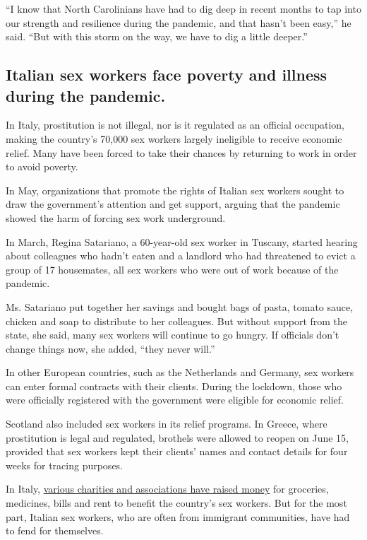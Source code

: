 ``I know that North Carolinians have had to dig deep in recent months to
tap into our strength and resilience during the pandemic, and that
hasn't been easy,'' he said. ``But with this storm on the way, we have
to dig a little deeper.''

\hypertarget{italian-sex-workers-face-poverty-and-illness-during-the-pandemic}{%
\subsection{Italian sex workers face poverty and illness during the
pandemic.}\label{italian-sex-workers-face-poverty-and-illness-during-the-pandemic}}

In Italy, prostitution is not illegal, nor is it regulated as an
official occupation, making the country's 70,000 sex workers largely
ineligible to receive economic relief. Many have been forced to take
their chances by returning to work in order to avoid poverty.

In May, organizations that promote the rights of Italian sex workers
sought to draw the government's attention and get support, arguing that
the pandemic showed the harm of forcing sex work underground.

In March, Regina Satariano, a 60-year-old sex worker in Tuscany, started
hearing about colleagues who hadn't eaten and a landlord who had
threatened to evict a group of 17 housemates, all sex workers who were
out of work because of the pandemic.

Ms. Satariano put together her savings and bought bags of pasta, tomato
sauce, chicken and soap to distribute to her colleagues. But without
support from the state, she said, many sex workers will continue to go
hungry. If officials don't change things now, she added, ``they never
will.''

In other European countries, such as the Netherlands and Germany, sex
workers can enter formal contracts with their clients. During the
lockdown, those who were officially registered with the government were
eligible for economic relief.

Scotland also included sex workers in its relief programs. In Greece,
where prostitution is legal and regulated, brothels were allowed to
reopen on June 15, provided that sex workers kept their clients' names
and contact details for four weeks for tracing purposes.

In Italy,
\href{https://www.produzionidalbasso.com/project/covid19-nessuna-da-sola-solidarieta-immediata-alle-lavoratrici-sessuali-piu-colpite-dall-emergenza/}{various
charities and associations have raised money} for groceries, medicines,
bills and rent to benefit the country's sex workers. But for the most
part, Italian sex workers, who are often from immigrant communities,
have had to fend for themselves.

